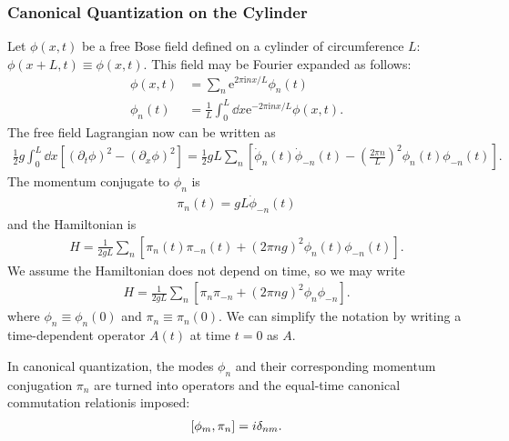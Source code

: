 \documentclass[10pt]{article}
\newcommand{\me}{\mathrm{e}}
\newcommand{\ii}{\mathrm{i}}
\begin{document}
\subsubsection{Canonical Quantization on the Cylinder}
Let $\phi(x,t)$ be a free Bose field defined on a cylinder of circumference $L$: $\phi(x+L,t)\equiv\phi(x,t)$.
This field may be Fourier expanded as follows:
\begin{subequations}
    \begin{align}
        \phi(x,t) & =\sum_n\me^{2\pi\ii nx/L}\phi_n(t)                                                            \\
        \phi_n(t) & =\frac{1}{L}\int_0^L\dd{x}\me^{-2\pi\ii nx/L}\phi(x,t).\label{eq:operator:boson:mode_field:2}
    \end{align}
\end{subequations}
The free field Lagrangian now can be written as
\begin{align}
    \frac{1}{2}g\int_0^L\dd{x}\left[\left(\partial_t\phi\right)^2-\left(\partial_x\phi\right)^2\right]=\frac{1}{2}gL\sum_n\left[\dot{\phi}_n(t)\dot{\phi}_{-n}(t)-\left(\frac{2\pi n}{L}\right)^2\phi_n(t)\phi_{-n}(t)\right].
\end{align}
The momentum conjugate to $\phi_n$ is
\begin{align}
    \pi_n(t)=gL\dot{\phi}_{-n}(t)
\end{align}
and the Hamiltonian is
\begin{align}
    H=\frac{1}{2gL}\sum_n\left[\pi_n(t)\pi_{-n}(t)+\left(2\pi ng\right)^2\phi_n(t)\phi_{-n}(t)\right].
\end{align}
We assume the Hamiltonian does not depend on time, so we may write
\begin{align}
    H=\frac{1}{2gL}\sum_n\left[\pi_n\pi_{-n}+\left(2\pi ng\right)^2\phi_n\phi_{-n}\right].
\end{align}
where $\phi_n\equiv\phi_n(0)$ and $\pi_n\equiv\pi_n(0)$.
We can simplify the notation by writing a time-dependent operator $A(t)$ at time $t=0$ as $A$.
\begin{property}
    In canonical quantization, the modes $\phi_n$ and their corresponding momentum conjugation $\pi_n$ are turned into operators and the equal-time canonical commutation relation\snm is imposed:
    \begin{align}
        \comm{\phi_m}{\pi_n}=i\delta_{nm}.\label{eq:operator:boson:commutation}
    \end{align}
\end{property}
\end{document}
